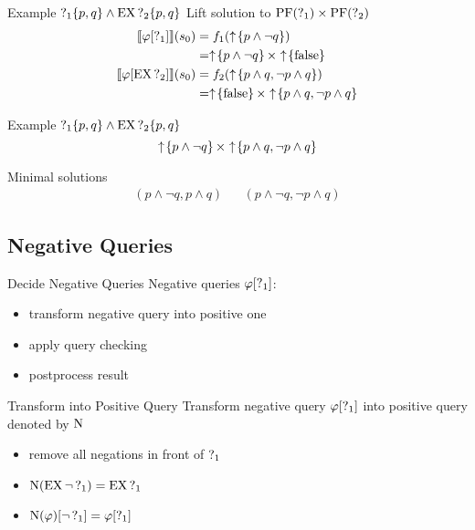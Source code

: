 \begin{frame}{Example $\operatorname{?}_1\{p,q\} \land \operatorname{EX}\operatorname{?}_2\{p,q\}$}
  Lift solution to $\operatorname{PF}(\operatorname{?}_1) \times \operatorname{PF}(\operatorname{?}_2)$
  \begin{align*}
    \llbracket \varphi[\operatorname{?}_1] \rrbracket (s_0) 
      &= f_1(\uparrow \! \left\{ p \land \lnot q \right\}) \\
      &= \uparrow \! \left\{ p \land \lnot q \right\} \times \uparrow \! \left\{ \operatorname{false} \right\} \\
    \llbracket \varphi[\operatorname{EX}\operatorname{?}_2] \rrbracket (s_0) 
      &= f_2(\uparrow \! \left\{ p \land q, \lnot p \land q \right\}) \\
      &= \uparrow \! \left\{ \operatorname{false} \right\} \times \uparrow \! \left\{ p \land q, \lnot p \land q \right\}
  \end{align*}
\end{frame}

\begin{frame}{Example $\operatorname{?}_1\{p,q\} \land \operatorname{EX}\operatorname{?}_2\{p,q\}$}
  \[
    \uparrow \! \left\{ p \land \lnot q \right\} \times \uparrow \! \left\{ p \land q, \lnot p \land q \right\}
  \]

  Minimal solutions
  \begin{align*}
    (p \land \lnot q, p \land q) && (p \land \lnot q,\lnot p \land q)
  \end{align*}
\end{frame}



\subsection{Negative Queries}%

\begin{frame}{Decide Negative Queries}
  Negative queries $\varphi[\operatorname{?}_1]$:
  \begin{itemize}
    \item transform negative query into positive one
    \item apply query checking
    \item postprocess result
  \end{itemize}
\end{frame}

\begin{frame}{Transform into Positive Query}
  Transform negative query $\varphi[\operatorname{?}_1]$ into positive query denoted by $\operatorname{N}$
  \begin{itemize}
    \item remove all negations in front of $\operatorname{?}_{1}$
    \item $\operatorname{N}(\operatorname{EX} \lnot \operatorname{?}_1) = \operatorname{EX} \operatorname{?}_{1}$
    \item $\operatorname{N}(\varphi)[\lnot\operatorname{?}_1] = \varphi[\operatorname{?}_1]$
  \end{itemize}
\end{frame}

